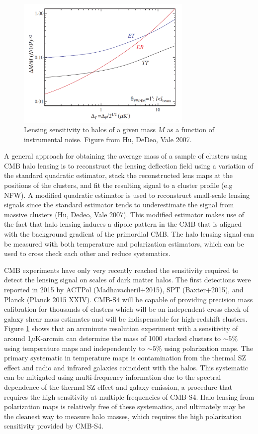 \begin{figure}[htbp]
\centering 
\includegraphics[width=0.75\textwidth]{CMBLensing/HaloLensing.png}
\caption{Lensing sensitivity to halos of a given mass $M$ as a function of instrumental noise.  Figure from Hu, DeDeo, Vale 2007.}
\label{haloLens}
\end{figure}

A general approach for obtaining the average mass of a sample of clusters using CMB halo lensing is to reconstruct the lensing deflection field using a variation of the standard quadratic estimator, stack the reconstructed lens maps at the positions of the clusters, and fit the resulting signal to a cluster profile (e.g NFW). A modified quadratic estimator is used to reconstruct small-scale lensing signals since the standard estimator tends to underestimate the signal from massive clusters (Hu, Dedeo, Vale 2007).  This modified estimator makes use of the fact that halo lensing induces a dipole pattern in the CMB that is aligned with the background gradient of the primordial CMB.  The halo lensing signal can be measured with both temperature and polarization estimators, which can be used to cross check each other and reduce systematics. 

CMB experiments have only very recently reached the sensitivity required to detect the lensing signal on scales of dark matter halos.  The first detections were reported in 2015 by ACTPol (Madhavacheril+2015), SPT (Baxter+2015), and Planck (Planck 2015 XXIV).  CMB-S4 will be capable of providing precision mass calibration for thousands of clusters which will be an independent cross check of galaxy shear mass estimates and will be indispensable for high-redshift clusters. Figure \ref{haloLens} shows that an arcminute resolution experiment with a sensitivity of around 1$\mu$K-arcmin can determine the mass of 1000 stacked clusters to $\sim 5\%$ using temperature maps and independently to $\sim 5\%$ using polarization maps.
The primary systematic in temperature maps is contamination from the thermal SZ effect and radio and infrared galaxies coincident with the halos. This systematic can be mitigated using multi-frequency information due to the spectral dependence of the thermal SZ effect and galaxy emission, a procedure that
requires the high sensitivity at multiple frequencies of CMB-S4.  
Halo lensing from polarization maps is relatively free of these systematics, and ultimately may be the cleanest way to measure halo masses, which 
requires the high polarization sensitivity provided by CMB-S4. 

